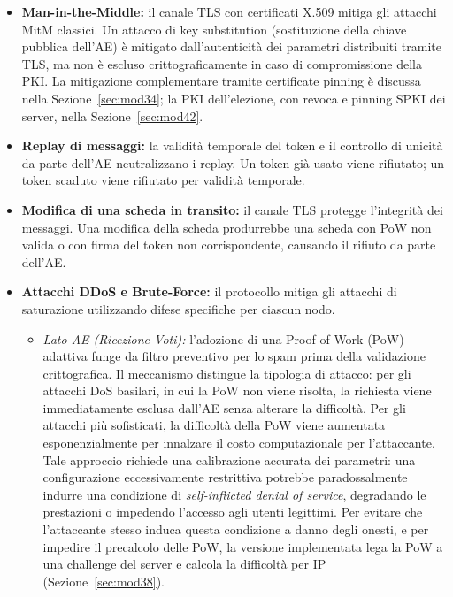 \documentclass[12pt,a4paper]{article}
\begin{document}
\begin{itemize}
  \item \textbf{Man-in-the-Middle:} il canale TLS con certificati X.509 mitiga gli attacchi MitM classici. Un attacco di key substitution (sostituzione della chiave pubblica dell'AE) è mitigato dall'autenticità dei parametri distribuiti tramite TLS, ma non è escluso crittograficamente in caso di compromissione della PKI. La mitigazione complementare tramite certificate pinning è discussa nella Sezione~\ref{sec:mod34}; la PKI dell'elezione, con revoca e pinning SPKI dei server, nella Sezione~\ref{sec:mod42}.
  \item \textbf{Replay di messaggi:} la validità temporale del token e il controllo di unicità da parte dell'AE neutralizzano i replay. Un token già usato viene rifiutato; un token scaduto viene rifiutato per validità temporale.
  \item \textbf{Modifica di una scheda in transito:} il canale TLS protegge l'integrità dei messaggi. Una modifica della scheda produrrebbe una scheda con PoW non valida o con firma del token non corrispondente, causando il rifiuto da parte dell'AE.
  \item \textbf{Attacchi DDoS e Brute-Force:} il protocollo mitiga gli attacchi di saturazione utilizzando difese specifiche per ciascun nodo.
    \begin{itemize}
      \item \textit{Lato AE (Ricezione Voti):} l'adozione di una Proof of Work (PoW) adattiva funge da filtro preventivo per lo spam prima della validazione crittografica. Il meccanismo distingue la tipologia di attacco: per gli attacchi DoS basilari, in cui la PoW non viene risolta, la richiesta viene immediatamente esclusa dall'AE senza alterare la difficoltà. Per gli attacchi più sofisticati, la difficoltà della PoW viene aumentata esponenzialmente per innalzare il costo computazionale per l'attaccante. Tale approccio richiede una calibrazione accurata dei parametri: una configurazione eccessivamente restrittiva potrebbe paradossalmente indurre una condizione di \textit{self-inflicted denial of service}, degradando le prestazioni o impedendo l'accesso agli utenti legittimi. Per evitare che l'attaccante stesso induca questa condizione a danno degli onesti, e per impedire il precalcolo delle PoW, la versione implementata lega la PoW a una challenge del server e calcola la difficoltà per IP (Sezione~\ref{sec:mod38}).

\end{itemize}
\end{itemize}
\end{document}
